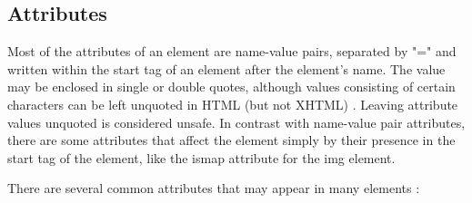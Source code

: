 \subsection{Attributes}

Most of the attributes of an element are name-value pairs, separated by "=" and written within the start tag of an element after the element's name. The value may be enclosed in single or double quotes, although values consisting of certain characters can be left unquoted in HTML (but not XHTML) . Leaving attribute values unquoted is considered unsafe. In contrast with name-value pair attributes, there are some attributes that affect the element simply by their presence in the start tag of the element, like the ismap attribute for the img element.

There are several common attributes that may appear in many elements :

